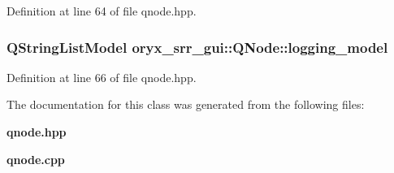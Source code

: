 \-Definition at line 64 of file qnode.\-hpp.

\subsubsection[{logging\-\_\-model}]{\setlength{\rightskip}{0pt plus 5cm}\-Q\-String\-List\-Model {\bf oryx\-\_\-srr\-\_\-gui\-::\-Q\-Node\-::logging\-\_\-model}\hspace{0.3cm}{\ttfamily  [private]}}\label{classoryx__srr__gui_1_1QNode_aefcfc7970dca9c2634b964db207255cd}


\-Definition at line 66 of file qnode.\-hpp.



\-The documentation for this class was generated from the following files\-:\begin{DoxyCompactItemize}
\item 
{\bf qnode.\-hpp}\item 
{\bf qnode.\-cpp}\end{DoxyCompactItemize}

